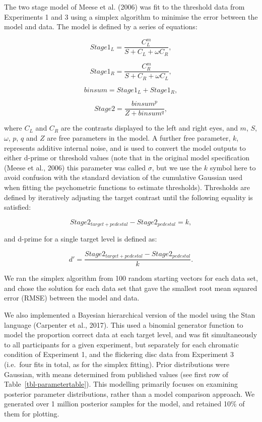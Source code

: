 \documentclass[
  letterpaper,
  DIV=11,
  numbers=noendperiod]{scrartcl}
\begin{document}
The two stage model of Meese et al. (2006) was fit to the threshold data
from Experiments 1 and 3 using a simplex algorithm to minimise the error
between the model and data. The model is defined by a series of
equations:

\begin{equation}
Stage1_L = \frac{C_L^m}{S + C_L + \omega C_R},
\end{equation}

\begin{equation}
Stage1_R = \frac{C_R^m}{S + C_R + \omega C_L},
\end{equation}

\begin{equation}
binsum = Stage1_L + Stage1_R,
\end{equation}

\begin{equation}
Stage2 = \frac{binsum^p}{Z + binsum^q},
\end{equation}

where \(C_L\) and \(C_R\) are the contrasts displayed to the left and
right eyes, and \(m\), \(S\), \(\omega\), \(p\), \(q\) and \(Z\) are
free parameters in the model. A further free parameter, \(k\),
represents additive internal noise, and is used to convert the model
outputs to either d-prime or threshold values (note that in the original
model specification (Meese et al., 2006) this parameter was called
\(\sigma\), but we use the \(k\) symbol here to avoid confusion with the
standard deviation of the cumulative Gaussian used when fitting the
psychometric functions to estimate thresholds). Thresholds are defined
by iteratively adjusting the target contrast until the following
equality is satisfied:

\begin{equation}
Stage2_{target+pedestal} - Stage2_{pedestal} = k,
\end{equation}

and d-prime for a single target level is defined as:

\begin{equation}
d' = \frac{Stage2_{target+pedestal} - Stage2_{pedestal}}{k}.
\end{equation}

We ran the simplex algorithm from 100 random starting vectors for each
data set, and chose the solution for each data set that gave the
smallest root mean squared error (RMSE) between the model and data.

We also implemented a Bayesian hierarchical version of the model using
the Stan language (Carpenter et al., 2017). This used a binomial
generator function to model the proportion correct data at each target
level, and was fit simultaneously to all participants for a given
experiment, but separately for each chromatic condition of Experiment 1,
and the flickering disc data from Experiment 3 (i.e.~four fits in total,
as for the simplex fitting). Prior distributions were Gaussian, with
means determined from published values (see first row of
Table~\ref{tbl-parametertable}). This modelling primarily focuses on
examining posterior parameter distributions, rather than a model
comparison approach. We generated over 1 million posterior samples for
the model, and retained 10\% of them for plotting.
\end{document}
